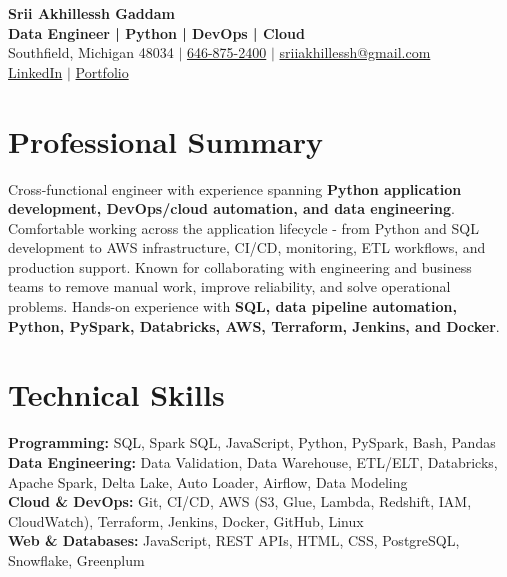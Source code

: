 \documentclass[letterpaper,10pt]{article}
\begin{document}
\fontsize{9.35pt}{10.45pt}\selectfont

\begin{center}
    {\LARGE \textbf{Srii Akhillessh Gaddam}} \\[-1pt]
    \textbf{Data Engineer | Python | DevOps | Cloud} \\[2pt]
    Southfield, Michigan 48034 $|$
    \href{tel:6468752400}{646-875-2400} $|$
    \href{mailto:sriiakhillessh@gmail.com}{sriiakhillessh@gmail.com} \\[1pt]
    \href{https://www.linkedin.com/in/srii-akhiilessh-gaddam-b48668191/}{LinkedIn} $|$
    \href{https://sriiakhillesshg.github.io/portfolio/}{Portfolio}
\end{center}
\vspace{-8pt}

\section{Professional Summary}
\small{Cross-functional engineer with experience spanning \textbf{Python application development, DevOps/cloud automation, and data engineering}. Comfortable working across the application lifecycle - from Python and SQL development to AWS infrastructure, CI/CD, monitoring, ETL workflows, and production support. Known for collaborating with engineering and business teams to remove manual work, improve reliability, and solve operational problems. Hands-on experience with \textbf{SQL, data pipeline automation, Python, PySpark, Databricks, AWS, Terraform, Jenkins, and Docker}.}

\section{Technical Skills}
\small{
\textbf{Programming:} SQL, Spark SQL, JavaScript, Python, PySpark, Bash, Pandas \\
\textbf{Data Engineering:} Data Validation, Data Warehouse, ETL/ELT, Databricks, Apache Spark, Delta Lake, Auto Loader, Airflow, Data Modeling \\
\textbf{Cloud \& DevOps:} Git, CI/CD, AWS (S3, Glue, Lambda, Redshift, IAM, CloudWatch), Terraform, Jenkins, Docker, GitHub, Linux \\
\textbf{Web \& Databases:} JavaScript, REST APIs, HTML, CSS, PostgreSQL, Snowflake, Greenplum
}
\end{document}
